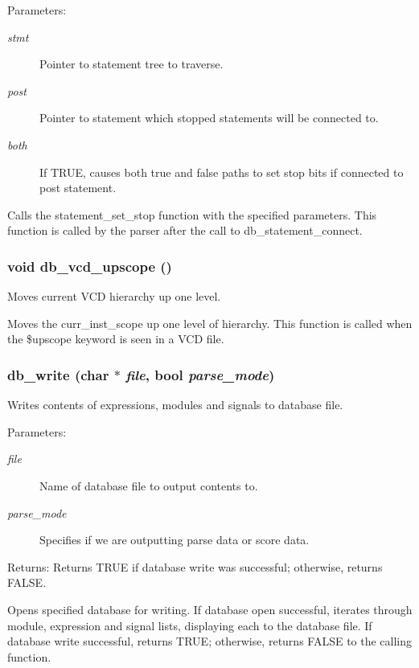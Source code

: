 \begin{Desc}
\item[Parameters:]
\begin{description}
\item[{\em stmt}]Pointer to statement tree to traverse. \item[{\em post}]Pointer to statement which stopped statements will be connected to. \item[{\em both}]If TRUE, causes both true and false paths to set stop bits if connected to post statement.\end{description}
\end{Desc}
Calls the statement\_\-set\_\-stop function with the specified parameters. This function is called by the parser after the call to db\_\-statement\_\-connect. 
\subsubsection{\setlength{\rightskip}{0pt plus 5cm}void db\_\-vcd\_\-upscope ()}\label{db_8h_a21}


Moves current VCD hierarchy up one level.

Moves the curr\_\-inst\_\-scope up one level of hierarchy. This function is called when the \$upscope keyword is seen in a VCD file. 
\subsubsection{ db\_\-write (char $\ast$ {\em file}, {\bf bool} {\em parse\_\-mode})}\label{db_8h_a0}


Writes contents of expressions, modules and signals to database file.

\begin{Desc}
\item[Parameters:]
\begin{description}
\item[{\em file}]Name of database file to output contents to. \item[{\em parse\_\-mode}]Specifies if we are outputting parse data or score data.\end{description}
\end{Desc}
\begin{Desc}
\item[Returns:]Returns TRUE if database write was successful; otherwise, returns FALSE.\end{Desc}
Opens specified database for writing. If database open successful, iterates through module, expression and signal lists, displaying each to the database file. If database write successful, returns TRUE; otherwise, returns FALSE to the calling function. 